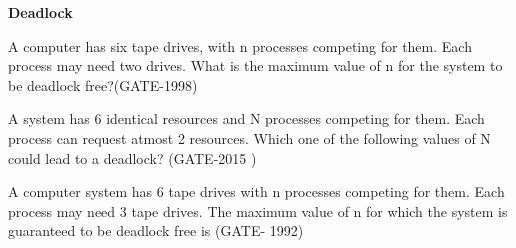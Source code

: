 \centerline{\textbf{ \LARGE Deadlock}}


\begin{minipage}{\linewidth}

  \question  A computer has six tape drives, with n processes competing for them. Each process may need two drives.
             What is the maximum value of n for the system to be deadlock free?(GATE-1998)

  \begin{oneparchoices}
  \end{oneparchoices}

  \end{minipage}

\vspace{0.08in}


\begin{minipage}{\linewidth}

  \question  A system has 6 identical resources and N processes competing for them. Each process can request atmost 2 resources. Which one of the following values of N could lead to a deadlock? (GATE-2015 )

  \begin{oneparchoices}
  \end{oneparchoices}

  \end{minipage}

\vspace{0.08in}


\begin{minipage}{\linewidth}

  \question  A computer system has 6 tape drives with n processes competing for them. Each process may need 3 tape drives. The maximum value of n for which the system is guaranteed to be deadlock free is (GATE- 1992)

  \begin{oneparchoices}
  \end{oneparchoices}

  \end{minipage}


